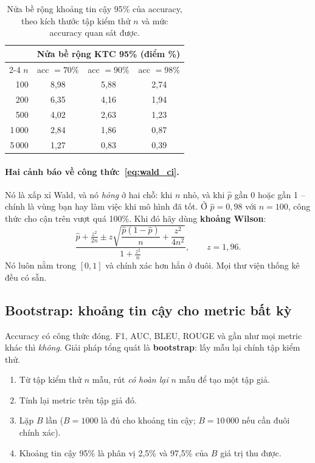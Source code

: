 \begin{table}[H]
\centering
\small
\begin{tabular}{@{}rccc@{}}
\toprule
& \multicolumn{3}{c}{\textbf{Nửa bề rộng KTC 95\% (điểm \%)}} \\
\cmidrule(l){2-4}
$n$ & acc $=70\%$ & acc $=90\%$ & acc $=98\%$ \\
\midrule
100    & 8{,}98 & 5{,}88 & 2{,}74 \\
200    & 6{,}35 & 4{,}16 & 1{,}94 \\
500    & 4{,}02 & 2{,}63 & 1{,}23 \\
1\,000 & 2{,}84 & 1{,}86 & 0{,}87 \\
5\,000 & 1{,}27 & 0{,}83 & 0{,}39 \\
\bottomrule
\end{tabular}
\caption{Nửa bề rộng khoảng tin cậy 95\% của accuracy, theo kích thước tập kiểm thử $n$ và mức accuracy quan sát được.}
\label{tab:ci_accuracy}
\end{table}

\paragraph{Hai cảnh báo về công thức~\eqref{eq:wald_ci}.} Nó là xấp xỉ Wald, và nó \emph{hỏng} ở hai chỗ: khi $n$ nhỏ, và khi $\hat p$ gần 0 hoặc gần 1 -- chính là vùng bạn hay làm việc khi mô hình đã tốt. Ở $\hat p = 0{,}98$ với $n = 100$, công thức cho cận trên vượt quá 100\%. Khi đó hãy dùng \textbf{khoảng Wilson}:
\[
\frac{\hat p + \frac{z^2}{2n} \pm z\sqrt{\dfrac{\hat p(1-\hat p)}{n} + \dfrac{z^2}{4n^2}}}{1 + \frac{z^2}{n}}, \qquad z = 1{,}96 .
\]
Nó luôn nằm trong $[0,1]$ và chính xác hơn hẳn ở đuôi. Mọi thư viện thống kê đều có sẵn.

\subsection{Bootstrap: khoảng tin cậy cho metric bất kỳ}
\label{ssec:bootstrap}

Accuracy có công thức đóng. F1, AUC, BLEU, ROUGE và gần như mọi metric khác thì \emph{không}. Giải pháp tổng quát là \textbf{bootstrap}: lấy mẫu lại chính tập kiểm thử.

\begin{enumerate}
	\item Từ tập kiểm thử $n$ mẫu, rút \emph{có hoàn lại} $n$ mẫu để tạo một tập giả.
	\item Tính lại metric trên tập giả đó.
	\item Lặp $B$ lần ($B = 1000$ là đủ cho khoảng tin cậy; $B = 10\,000$ nếu cần đuôi chính xác).
	\item Khoảng tin cậy 95\% là phân vị 2{,}5\% và 97{,}5\% của $B$ giá trị thu được.
\end{enumerate}

